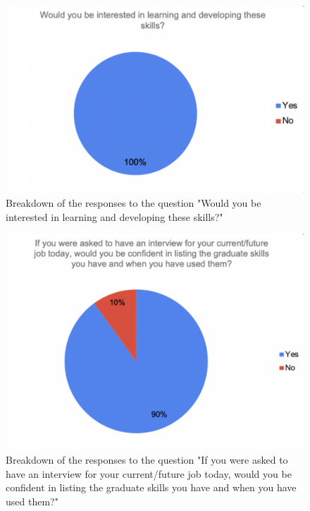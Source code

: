 \documentclass{l4proj}
\begin{document}
\begin{appendices}
\begin{figure}[H]
    \begin{centering}
    \includegraphics[scale=0.5]{images/GradAttr-2.pdf}
    \caption{Breakdown of the responses to the question "Would you be interested in learning and developing these skills?"}
    \label{fig: GradAttr-2}
    \end{centering}
\end{figure}

\begin{figure}[H]
    \begin{centering}
    \includegraphics[scale=0.5]{images/GradAttr-3.pdf}
    \caption{Breakdown of the responses to the question "If you were asked to have an interview for your current/future job today, would you be confident in listing the graduate skills you have and when you have used them?"}
    \label{fig: GradAttr-3}
    \end{centering}
\end{figure}


\end{appendices}
\end{document}
